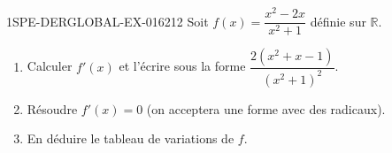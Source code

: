 \begin{exercice}{1SPE-DERGLOBAL-EX-016}{2}{12}
Soit $f(x) = \dfrac{x^2-2x}{x^2+1}$ définie sur $\mathbb{R}$.
\begin{enumerate}
  \item Calculer $f'(x)$ et l'écrire sous la forme $\dfrac{2(x^2 + x - 1)}{(x^2+1)^2}$.
  \item Résoudre $f'(x) = 0$ (on acceptera une forme avec des radicaux).
  \item En déduire le tableau de variations de $f$.
\end{enumerate}
\end{exercice}
